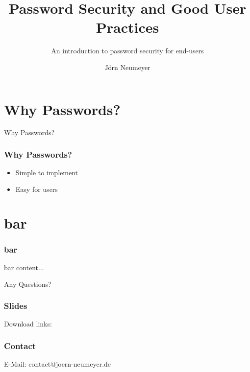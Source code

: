 \documentclass{beamer}
\title[Password Security]{Password Security and Good User Practices}
\subtitle{An introduction to password security for end-users}
\author{J\"orn Neumeyer}
\begin{document}
  \frame{\titlepage}
  \section{Why Passwords?}
  \begin{frame}
    \begin{center}
      \Huge Why Passwords?
    \end{center}
  \end{frame}
  \begin{frame}
    \frametitle{Why Passwords?}
    \begin{itemize}
      \item<1-> Simple to implement
      \item<2-> Easy for users
    \end{itemize}
  \end{frame}

  \section{bar}
  \begin{frame}
    \frametitle{bar}
    bar content...
  \end{frame}

  \begin{frame}
    \begin{center}
      \Huge Any Questions?
    \end{center}
  \end{frame}

  \begin{frame}
    \frametitle{Slides}
    \begin{center}
      \Large Download links:\newline
    \end{center}
  \end{frame}

  \begin{frame}
    \frametitle{Contact}
    \begin{center}
      \Large E-Mail: contact@joern-neumeyer.de
    \end{center}
  \end{frame}
\end{document}
